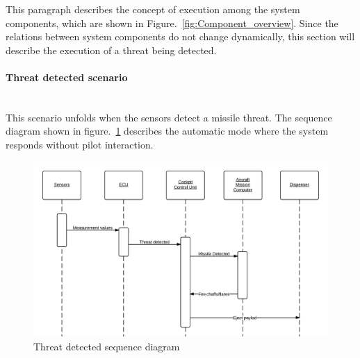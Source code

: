 This paragraph describes the concept of execution among the system components, which are shown in Figure.~\ref{fig:Component_overview}. Since the relations between system 
components do not change dynamically, this section will describe the execution of a threat being detected.

\paragraph{Threat detected scenario}\mbox{}\\
This scenario unfolds when the sensors detect a missile threat. The sequence diagram shown in figure.~\ref{fig:threatDetectedSeqDia} describes the automatic mode where the system responds without pilot 
interaction.

\begin{figure}[h]
	\centering
	\includegraphics[scale=0.18]{./images/threatDetectedSequenceDiagram.png}
	\caption{Threat detected sequence diagram}
    \label{fig:threatDetectedSeqDia}
\end{figure}

